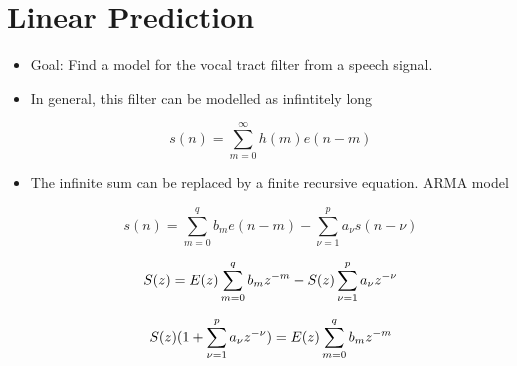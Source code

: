 
\newcommand{\indexTime}{n}
\newcommand{\convIndex}{m}
\newcommand{\excitationFunc}{e}
\newcommand{\filterFunc}{h}
\newcommand{\filtOutFunc}{s}
\newcommand{\predictionError}{d}
\newcommand{\Error}{E}
\newcommand{\newIndex}{\mu}
\newcommand{\autoCorr}{\phi_{s}}
\newcommand{\maConvIndex}{m}
\newcommand{\arConvIndex}{\nu}
\newcommand{\maFiltOrder}{q}
\newcommand{\arFiltOrder}{p}
\newcommand{\maFiltCoef}{b}
\newcommand{\arFiltCoef}{a}


\section{Linear Prediction}
\label{Linear Prediction}


\begin{itemize}

\item Goal: Find a model for the vocal tract filter from a speech signal.

\item In general, this filter can be modelled as infintitely long

\begin{equation}\filtOutFunc(\indexTime) = \sum^{\infty}_{\convIndex = 0} \filterFunc(\convIndex)\excitationFunc(\indexTime-\convIndex)\end{equation}

\item The infinite sum can be replaced by a finite recursive equation.
ARMA model 

\begin{equation}\filtOutFunc(\indexTime) = \sum^{\maFiltOrder}_{\maConvIndex = 0}\maFiltCoef_{\maConvIndex }\excitationFunc(\indexTime-\maConvIndex) -  \sum^{\arFiltOrder}_{\arConvIndex = 1}\arFiltCoef_{\arConvIndex }\filtOutFunc(\indexTime-\arConvIndex)\end{equation}

\begin{equation}\MakeUppercase{\filtOutFunc}(z) =\MakeUppercase{\excitationFunc}(z) \sum^{\maFiltOrder}_{\maConvIndex = 0}\maFiltCoef_{\maConvIndex }z^{-\maConvIndex} -  \MakeUppercase{\filtOutFunc}(z) \sum^{\arFiltOrder}_{\arConvIndex = 1}\arFiltCoef_{\arConvIndex }z^{-\arConvIndex}\end{equation}

\begin{equation}\MakeUppercase{\filtOutFunc}(z)(1 +  \sum^{\arFiltOrder}_{\arConvIndex = 1}\arFiltCoef_{\arConvIndex }z^{-\arConvIndex}) =\MakeUppercase{\excitationFunc}(z) \sum^{\maFiltOrder}_{\maConvIndex = 0}\maFiltCoef_{\maConvIndex }z^{-\maConvIndex} \end{equation}


\end{itemize}
